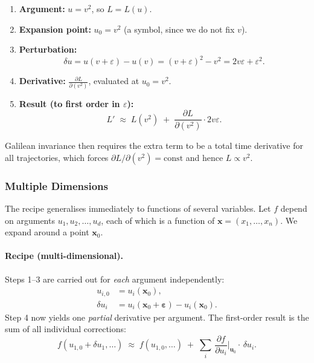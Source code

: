 \documentclass{article}
\begin{document}
	\begin{enumerate}
		\item \textbf{Argument:} $u = v^2$, so $L = L(u)$.
		\item \textbf{Expansion point:} $u_0 = v^2$ (a symbol, since we do not
		fix $v$).
		\item \textbf{Perturbation:}
		\begin{equation}
			\delta u
			= u(v+\varepsilon) - u(v)
			= (v+\varepsilon)^2 - v^2
			= 2v\varepsilon + \varepsilon^2.
		\end{equation}
		\item \textbf{Derivative:} $\displaystyle\frac{\partial L}{\partial(v^2)}$,
		evaluated at $u_0 = v^2$.
		\item \textbf{Result (to first order in $\varepsilon$):}
		\begin{equation}
			L' \;\approx\; L(v^2) \;+\; \frac{\partial L}{\partial(v^2)}
			\cdot 2v\varepsilon.
		\end{equation}
	\end{enumerate}
	
	\noindent Galilean invariance then requires the extra term to be a total time
	derivative for all trajectories, which forces
	$\partial L/\partial(v^2) = \mathrm{const}$ and hence $L \propto v^2$.
	
	\subsubsection*{Multiple Dimensions}
	
	The recipe generalises immediately to functions of several variables.  Let
	$f$ depend on arguments $u_1, u_2, \ldots, u_d$, each of which is a function
	of $\boldsymbol{x} = (x_1, \ldots, x_n)$.  We expand around a point
	$\boldsymbol{x}_0$.
	
	\paragraph{Recipe (multi-dimensional).}
	
	Steps 1--3 are carried out for \emph{each} argument independently:
	\begin{align}
		u_{i,0} &= u_i(\boldsymbol{x}_0), \\
		\delta u_i &= u_i(\boldsymbol{x}_0 + \boldsymbol{\varepsilon})
		- u_i(\boldsymbol{x}_0).
	\end{align}
	Step 4 now yields one \emph{partial} derivative per argument.  The first-order
	result is the sum of all individual corrections:
	\begin{equation}
		\boxed{f(u_{1,0}+\delta u_1,\ldots) \;\approx\; f(u_{1,0},\ldots)
			\;+\; \sum_{i}\,\frac{\partial f}{\partial u_i}\bigg|_{\boldsymbol{u}_0}
			\cdot\,\delta u_i.}
		\label{eq:taylor_md_1}
	\end{equation}
	
\end{document}

